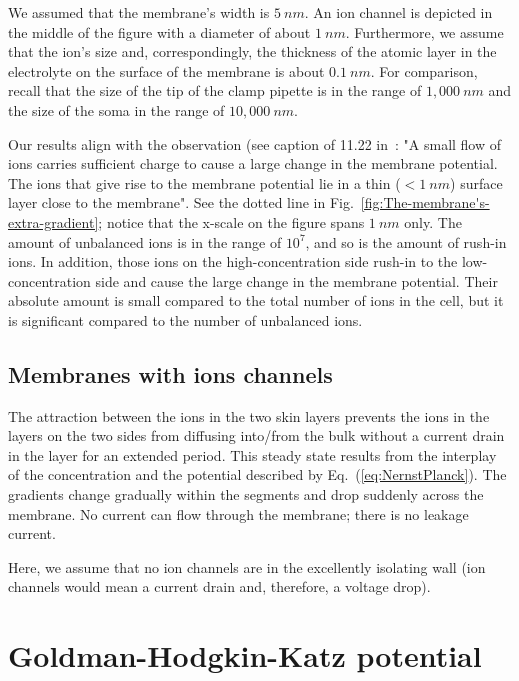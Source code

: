 We assumed that the membrane's width is $5\ nm$. An ion channel is
depicted in the middle of the figure with a diameter of about $1\ nm$.
Furthermore, we assume that the ion's size and, correspondingly, the
thickness of the atomic layer in the electrolyte on the surface of
the membrane is about $0.1\ nm$. For comparison, recall that the
size of the tip of the clamp pipette is in the range of $1,000\ nm$
and the size of the soma in the range of $10,000\ nm$. 

Our results align with the observation (see caption of 11.22 in~\cite{MolecularBiology:2002}:
"A small flow of ions carries sufficient charge to cause a large change in the membrane potential.
The ions that give rise to the membrane potential lie in a thin ($< 1\ nm$) surface layer close to the membrane".
See the dotted line in Fig.~\ref{fig:The-membrane's-extra-gradient}; notice that the x-scale on the figure spans $1\ nm$ only.
The amount of unbalanced ions is in the range of $10^7$,
and so is the amount of rush-in ions. In addition, those 
ions on the high-concentration side rush-in to the 
low-concentration side and cause the large change in the 
membrane potential. Their absolute amount is small compared to the total number of ions in the cell,
but it is significant compared to the number of unbalanced ions.


\subsection{Membranes with ions channels\label{sec:Physics-MembranesWithChannels}}

The attraction between the ions in the two skin layers
prevents the ions in the layers on the two sides from diffusing into/from
the bulk without a current drain in the layer for an extended period.
This steady state results from the interplay of the concentration
and the potential described by Eq.~(\ref{eq:NernstPlanck}). The gradients
change gradually within the segments and drop suddenly across the membrane.
No current can flow through the membrane; there is no leakage current.



Here, we
assume that no ion channels are in the excellently isolating wall
(ion channels would mean a current drain and, therefore, a voltage
drop). 

\section{Goldman-Hodgkin-Katz potential\label{sec:Physics-Goldman-Hodgkin-Katz}}


